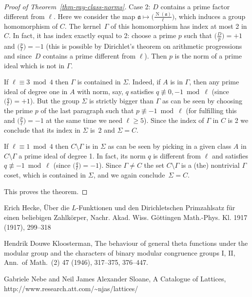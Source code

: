 \documentclass[12pt, a4paper, draft]{article}
\theoremstyle{plain}
\newtheorem*{Main Theorem}{Main Theorem}
\begin{document}
{{\begin{proof}[Proof of Theorem~\ref{thm-ray-class-norms}]
  Case 2: $D$ contains a prime factor different from $\ell$. Here we
  consider the map ${\mathfrak a}\mapsto {\big(\frac{{{\operatorname{{N}}}(\mathfrak
    a)}}{\ell}\big)}$, which induces a group homomorphism of $C$.  The
  kernel~$\Gamma$ of this homomorphism has index at most 2 in $C$.  In
  fact, it has index exactly equal to 2: choose a prime $p$ such that
  ${\big(\frac{D}{p}\big)}=+1$ and ${\big(\frac{p}{\ell}\big)}=-1$ (this is possible by
  Dirichlet's theorem on arithmetic progressions and since~$D$
  contains a prime different from $\ell$). Then $p$ is the norm of a
  prime ideal which is not in $\Gamma$.

  If $\ell \equiv 3 \bmod 4$ then $\Gamma$ is contained in $\Sigma$.
  Indeed, if $A$ is in $\Gamma$, then any prime ideal of degree one in
  $A$ with norm, say, $q$ satisfies $q\not\equiv 0,-1 \bmod \ell$
  (since ${\big(\frac{q}{\ell}\big)}=+1$).  But the group $\Sigma$ is strictly
  bigger than $\Gamma$ as can be seen by choosing the prime $p$ of the
  last paragraph such that $p\not\equiv -1 \bmod \ell$ (for fulfilling
  this and ${\big(\frac{p}{\ell}\big)}=-1$ at the same time we need $\ell\ge 5$).
  Since the index of $\Gamma$ in $C$ is 2 we conclude that its index
  in $\Sigma$ is~2 and $\Sigma=C$.

  If $\ell \equiv 1 \bmod 4$ then $C\setminus\Gamma$ is in $\Sigma$ as
  can be seen by picking in a given class $A$ in $C\setminus\Gamma$ a
  prime ideal of degree 1. In fact, its norm $q$ is different from
  $\ell$ and satisfies $q \not\equiv -1 \bmod \ell$ (since ${\big(\frac{q}{\ell}\big)}=-1$). Since $\Gamma\not= C$ the set $C\setminus\Gamma$ is a
  (the) nontrivial $\Gamma$ coset, which is contained in $\Sigma$, and
  we again conclude~$\Sigma = C$.

  This proves the theorem.
\end{proof}

\begin{thebibliography}{Hecke}

 Erich Hecke, \"Uber die $L$-Funktionen und den
  Dirichletschen Prim\-zahlsatz f\"ur einen beliebigen Zahlk\"orper,
  Nachr. Akad. Wiss. G\"ott\-ingen Math.-Phys. Kl. 1917 (1917), 299--318

 Hendrik Douwe Kloosterman, The behaviour of general
  theta functions under the modular group and the characters of binary
  modular congruence groups I, II, Ann.~of Math.~(2) 47 (1946),
  317--375, 376--447.

 Gabriele Nebe and Neil James Alexander Sloane, A
  Catalogue of Lattices,
  http:/\hskip-3pt/www.research.att.com/\~{}njas/lattices/


\end{thebibliography}}}
\end{document}
